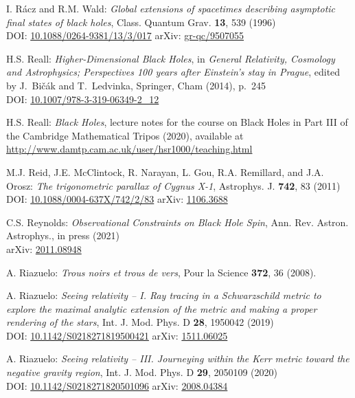 \begin{thebibliography}{123}
I. R\'acz and R.M. Wald:
{\em Global extensions of spacetimes describing asymptotic final states of black holes},
Class. Quantum Grav. {\bf 13}, 539 (1996)\\
DOI: \href{https://doi.org/10.1088/0264-9381/13/3/017}{10.1088/0264-9381/13/3/017}\hfill
arXiv: \href{https://arxiv.org/abs/gr-qc/9507055}{gr-qc/9507055}

H.S. Reall:
{\em Higher-Dimensional Black Holes},
in {\em  General Relativity, Cosmology and Astrophysics; Perspectives 100 years after Einstein's stay in Prague}, edited by J.~Bičák and T.~Ledvinka,
Springer, Cham (2014), p.~245\\
DOI: \href{https://doi.org/10.1007/978-3-319-06349-2_12}{10.1007/978-3-319-06349-2\_12}

H.S. Reall: {\em Black Holes}, lecture notes for the course on Black Holes in
Part III of the Cambridge Mathematical Tripos (2020), available at \\
\url{http://www.damtp.cam.ac.uk/user/hsr1000/teaching.html}

M.J. Reid, J.E. McClintock, R. Narayan, L. Gou, R.A. Remillard, and J.A. Orosz:
{\em The trigonometric parallax of Cygnus X-1},
Astrophys. J. {\bf 742}, 83 (2011)\\
DOI: \href{https://doi.org/10.1088/0004-637X/742/2/83}{10.1088/0004-637X/742/2/83}\hfill
arXiv: \href{https://arxiv.org/abs/1106.3688}{1106.3688}

C.S. Reynolds:
{\em Observational Constraints on Black Hole Spin},
Ann. Rev. Astron. Astrophys., in press (2021)\\
arXiv: \href{https://arxiv.org/abs/2011.08948}{2011.08948}

A. Riazuelo:
{\em Trous noirs et trous de vers},
Pour la Science {\bf 372}, 36 (2008).

A. Riazuelo:
{\em Seeing relativity -- I. Ray tracing in a Schwarzschild metric to explore the maximal analytic extension of the metric and making a proper rendering of the stars},
Int. J. Mod. Phys. D {\bf 28}, 1950042 (2019)\\
DOI: \href{https://doi.org/10.1142/S0218271819500421}{10.1142/S0218271819500421}
\hfill
arXiv: \href{https://arxiv.org/abs/1511.06025}{1511.06025}

A. Riazuelo:
{\em Seeing relativity -- III. Journeying within the Kerr metric toward the negative gravity region},
Int. J. Mod. Phys. D {\bf 29}, 2050109 (2020)\\
DOI: \href{https://doi.org/10.1142/S0218271820501096}{10.1142/S0218271820501096}\hfill
arXiv: \href{https://arxiv.org/abs/2008.04384}{2008.04384}


\end{thebibliography}
